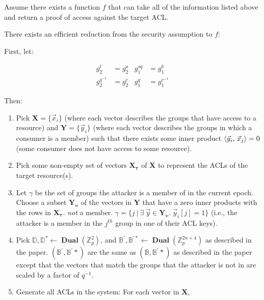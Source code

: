 \documentclass[pdftex,12pt,a4papaer,twoside,notitlepage]{report}
\DeclareMathOperator{\dual}{\mathbf{Dual}}
\begin{document}
Assume there exists a function $f$ that can take all of the information listed
above and return a proof of access against the target ACL.

There exists an efficient reduction from the security assumption to $f$:

First, let:

\begin{align*}
  g_2^t &= g_2^a & g_1^{sq} &= g_1^b \\
  g_2^{q^{-1}} &= g_2^c & g_1^{q} &= g_1^{c^{-1}}
\end{align*}

Then: \\

\begin{enumerate}
\item Pick $\mathbf{X} = \{\vec{x}_i\}$ (where each vector describes the groups
  that have access to a resource) and $\mathbf{Y} = \{\vec{y}_i\}$ (where each
  vector describes the groups in which a consumer is a member) 
  such that there exists some inner product $\langle \vec{y}_i,\,\vec{x}_j\rangle = 0$
  (some consumer does not have access to some resource).
\item Pick some non-empty set of vectors $\mathbf{X_\tau}$ of
  $\mathbf{X}$ to represent the ACLs of the target resource(s).
\item Let $\gamma$ be the set of groups the attacker is a member of in the
  current epoch. Choose a subset $\mathbf{Y_{\upsilon}}$ of the vectors in
  $\mathbf{Y}$ that have a zero inner products with the rows in
  $\mathbf{X_\tau}$. \emph{not} a member. $\gamma = \{ j ~ | ~ \exists~\vec{y}
  \in \mathbf{Y_\upsilon}.~\vec{y}_i[j] = 1 \}$ (i.e., the attacker is a member
  in the $j^{\mathit{th}}$ group in one of their ACL keys).
\item Pick $\mathbb{D}, \mathbb{D^*} \leftarrow
  \dual(\mathbb{Z}_p^2)$, and $\mathbb{B^\prime}, \mathbb{B^{\prime *}} \leftarrow
  \dual(\mathbb{Z}_p^{2n+4})$ as described in the paper. 
  $(\mathbb{B^\prime}, \mathbb{B^\prime *})$ are the same as $(\mathbb{B},
  \mathbb{B^\prime *})$ as described in the paper except that the vectors that
  match the groups that the attacker is not in are scaled by a factor of
  $q^{-1}$.
\item Generate all ACLs in the system: For each vector in $\mathbf{X}$,


\end{enumerate}
\end{document}
